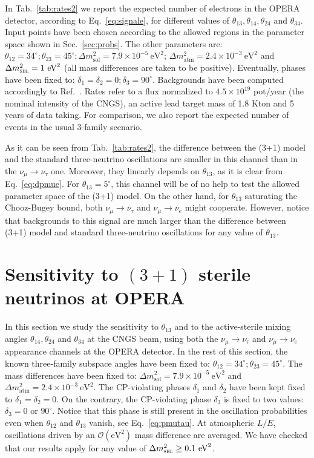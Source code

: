 \documentclass[12pt]{elsart}
\newcommand{\eVq}{\ensuremath{\text{eV}^2}}
\newcommand{\Dmq}{\Delta m^2}
\newcommand{\Sol}{\text{sol}}
\newcommand{\Atm}{\text{atm}}
\newcommand{\Sbl}{\textsc{sbl}}
\begin{document}
In Tab.~\ref{tab:rates2} we report the expected number of electrons in
the OPERA detector, according to Eq.~\eqref{eq:signale}, for different
values of $\theta_{13}, \theta_{14}, \theta_{24}$ and $\theta_{34}$.
Input points have been chosen according to the allowed regions in the
parameter space shown in Sec.~\ref{sec:probs}. The other parameters
are: $\theta_{12} = 34^\circ; \theta_{23} = 45^\circ; \Dmq_\Sol = 7.9
\times 10^{-5}~\eVq$; $\Dmq_\Atm = 2.4 \times 10^{-3}~\eVq$ and
$\Dmq_\Sbl = 1~\eVq$ (all mass differences are taken to be positive).
Eventually, phases have been fixed to: $\delta_1 = \delta_2 = 0;
\delta_3 = 90^\circ$. Backgrounds have been computed accordingly to
Ref.~\cite{Komatsu:2002sz}.  Rates refer to a flux normalized to $4.5
\times 10^{19}$ pot/year (the nominal intensity of the CNGS), an
active lead target mass of 1.8 Kton and 5 years of data taking. For
comparison, we also report the expected number of events in the usual
3-family scenario.

As it can be seen from Tab.~\ref{tab:rates2}, the difference between
the (3+1) model and the standard three-neutrino oscillations are
smaller in this channel than in the $\nu_\mu \to \nu_\tau$ one.
Moreover, they linearly depends on $\theta_{13}$, as it is clear from
Eq.~\eqref{eq:dpmue}. For $\theta_{13} = 5^\circ$, this channel will
be of no help to test the allowed parameter space of the (3+1) model.
On the other hand, for $\theta_{13}$ saturating the Chooz-Bugey bound,
both $\nu_\mu \to \nu_\tau$ and $\nu_\mu \to \nu_e$ might cooperate.
However, notice that backgrounds to this signal are much larger than
the difference between (3+1) model and standard three-neutrino
oscillations for any value of $\theta_{13}$.

\section{Sensitivity to $(3+1)$ sterile neutrinos at OPERA}
\label{sec:results}

In this section we study the sensitivity to $\theta_{13}$ and to the
active-sterile mixing angles $\theta_{14},\theta_{24}$ and
$\theta_{34}$ at the CNGS beam, using both the $\nu_\mu \to \nu_\tau$
and $\nu_\mu \to \nu_e$ appearance channels at the OPERA detector. In
the rest of this section, the known three-family subspace angles have
been fixed to: $\theta_{12} = 34^\circ; \theta_{23} = 45^\circ$. The
mass differences have been fixed to: $\Dmq_\Sol = 7.9 \times
10^{-5}~\eVq$ and $\Dmq_\Atm = 2.4 \times 10^{-3}~\eVq$.  The
CP-violating phases $\delta_1$ and $\delta_2$ have been kept fixed to
$\delta_1 = \delta_2 = 0$. On the contrary, the CP-violating phase 
$\delta_3$ is fixed to two values: $\delta_3 = 0$ or $90^\circ$. 
Notice that this phase is still present in the oscillation
probabilities even when $\theta_{12}$ and $\theta_{13}$ vanish, see
Eq.~\eqref{eq:pmutau}. At atmospheric $L/E$, oscillations driven by an
$\mathcal{O}(\eVq)$ mass difference are averaged. We have checked that
our results apply for any value of $\Dmq_\Sbl \geq 0.1~\eVq$. 
\end{document}
